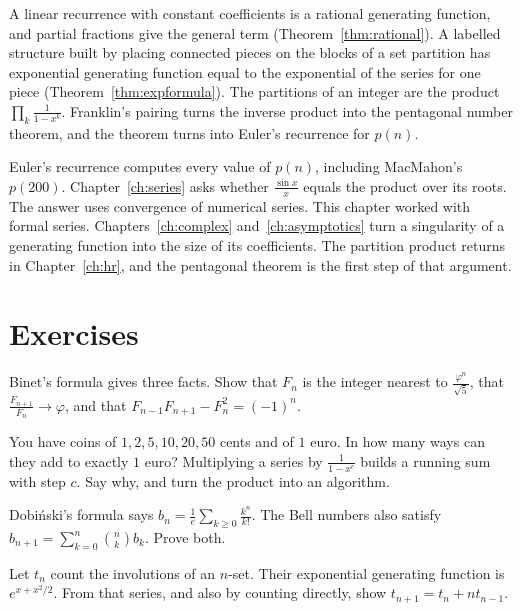 A linear recurrence with constant coefficients is a rational generating function, and partial fractions give the general term (Theorem~\ref{thm:rational}). A labelled structure built by placing connected pieces on the blocks of a set partition has exponential generating function equal to the exponential of the series for one piece (Theorem~\ref{thm:expformula}). The partitions of an integer are the product $\prod_k\frac1{1-x^k}$. Franklin's pairing turns the inverse product into the pentagonal number theorem, and the theorem turns into Euler's recurrence for $p(n)$.

Euler's recurrence computes every value of $p(n)$, including MacMahon's $p(200)$. Chapter~\ref{ch:series} asks whether $\frac{\sin x}x$ equals the product over its roots. The answer uses convergence of numerical series. This chapter worked with formal series. Chapters~\ref{ch:complex} and~\ref{ch:asymptotics} turn a singularity of a generating function into the size of its coefficients. The partition product returns in Chapter~\ref{ch:hr}, and the pentagonal theorem is the first step of that argument.

\section{Exercises}

\begin{exercise}[$\star$]\label{ex:binet}
Binet's formula gives three facts. Show that $F_n$ is the integer nearest to $\frac{\varphi^n}{\sqrt5}$, that
$\frac{F_{n+1}}{F_n}\to\varphi$, and that $F_{n-1}F_{n+1}-F_n^2=(-1)^n$.
\end{exercise}

\begin{exercise}[$\star$]\label{ex:change}
You have coins of $1,2,5,10,20,50$ cents and of $1$ euro. In how many ways can they add to exactly $1$ euro? Multiplying a
series by $\frac1{1-x^c}$ builds a running sum with step $c$. Say why, and turn the product into an algorithm.
\end{exercise}

\begin{exercise}[$\star\star$]\label{ex:dobinski}
Dobi\'nski's formula says $b_n=\frac1e\sum_{k\ge0}\frac{k^n}{k!}$. The Bell numbers also satisfy
$b_{n+1}=\sum_{k=0}^n\binom nkb_k$. Prove both.
\end{exercise}

\begin{exercise}[$\star\star$]\label{ex:involutions}
Let $t_n$ count the involutions of an $n$-set. Their exponential generating function is $e^{x+x^2/2}$. From that series, and also by counting directly, show $t_{n+1}=t_n+nt_{n-1}$.
\end{exercise}

